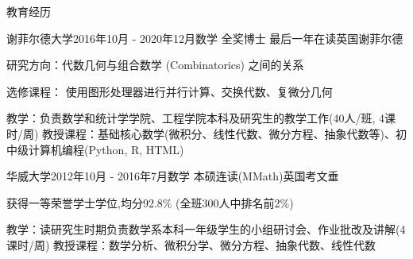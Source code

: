 \documentclass{zhresume} %
\begin{document}

\begin{rSection}{教育经历}

\begin{rSubsection}{谢菲尔德大学}{2016年10月 - 2020年12月}{数学 全奖博士 最后一年在读}{英国谢菲尔德}
\item 研究方向：代数几何与组合数学 (Combinatorics) 之间的关系
\item 选修课程： 使用图形处理器进行并行计算、交换代数、复微分几何
\item 教学：负责数学和统计学学院、工程学院本科及研究生的教学工作(40人/班, 4课时/周) \vspace{-0.2em} \newline
教授课程：基础核心数学(微积分、线性代数、微分方程、抽象代数等)、初中级计算机编程(Python, R, HTML)
\end{rSubsection}


\begin{rSubsection}{华威大学}{2012年10月 - 2016年7月}{数学 本硕连读(MMath)}{英国考文垂}
\item 获得一等荣誉学士学位,均分92.8\% (全班300人中排名前2\%)
\item 教学：读研究生时期负责数学系本科一年级学生的小组研讨会、作业批改及讲解(4课时/周) \vspace{-0.2em} \newline
教授课程：数学分析、微积分学、微分方程、抽象代数、线性代数
\end{rSubsection}

\end{rSection}

\end{document}

